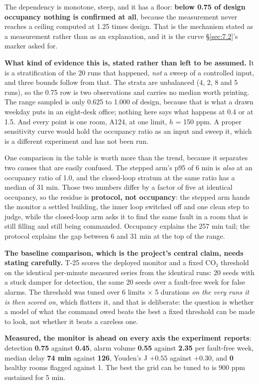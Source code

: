 The dependency is monotone, steep, and it has a floor: \textbf{below 0.75 of design occupancy
nothing is confirmed at all}, because the measurement never reaches a ceiling computed at 1.25
times design. That is the mechanism stated as a measurement rather than as an explanation, and it
is the curve §\ref{sec:7.2}'s marker asked for.

\textbf{What kind of evidence this is, stated rather than left to be assumed.} It is a
stratification of the 20 runs that happened, \emph{not} a sweep of a controlled input, and three
bounds follow from that. The strata are unbalanced (4, 2, 8 and 5 runs), so the 0.75 row is two
observations and carries no median worth printing. The range sampled is only 0.625 to 1.000 of
design, because that is what a drawn weekday puts in an eight-desk office; nothing here says what
happens at 0.4 or at 1.5. And every point is one room, A124, at one limit, $h$ = 150 ppm. A proper
sensitivity curve would hold the occupancy ratio as an input and sweep it, which is a different
experiment and has not been run.

One comparison in the table is worth more than the trend, because it separates two causes that are
easily confused. The stepped arm's p95 of 6 min is \emph{also} at an occupancy ratio of 1.0, and
the closed-loop stratum at the same ratio has a median of 31 min. Those two numbers differ by a
factor of five at identical occupancy, so the residue is \textbf{protocol, not occupancy}: the
stepped arm hands the monitor a settled building, the inner loop switched off and one clean step
to judge, while the closed-loop arm asks it to find the same fault in a room that is still filling
and still being commanded. Occupancy explains the 257 min tail; the protocol explains the gap
between 6 and 31 min at the top of the range.

\textbf{The baseline comparison, which is the project's central claim, needs stating carefully.}
T-25 scores the deployed monitor and a fixed CO₂ threshold on the identical per-minute measured
series from the identical runs: 20 seeds with a stuck damper for detection, the same 20 seeds over a
fault-free week for false alarms. The threshold was tuned over 6 limits $\times$ 5 durations
\emph{on the very runs it is then scored on}, which flatters it, and that is deliberate: the
question is whether a model of what the command owed beats the best a fixed threshold can be made
to look, not whether it beats a careless one.

\textbf{Measured, the monitor is ahead on every axis the experiment reports}: detection
\textbf{0.75} against \textbf{0.45}, alarm volume \textbf{0.55} against \textbf{2.35} per
fault-free week, median delay \textbf{74 min} against \textbf{126}, Youden's J \textbf{$+0.55$}
against \textbf{$+0.30$}, and \textbf{0} healthy rooms flagged against 1. The best the grid can be
tuned to is 900 ppm sustained for 5 min.

